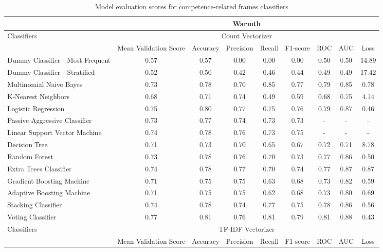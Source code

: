 \documentclass[Royal,sageapa,times]{sagej}
\begin{document}
\begin{landscape}
    \begin{longtable}[l]{lcccccccc}
    \caption{Model evaluation scores for competence-related frames classifiers}
    \label{table11}
    \hline
    & \multicolumn{8}{c}{Warmth} \\ \hline
    \endhead
    \multirow{2}{*}{Classifiers} & \multicolumn{8}{c}{Count Vectorizer} \\ \cline{2-9}
    & Mean   Validation Score & Accuracy & Precision & Recall & F1-score & ROC & AUC & Loss \\ \hline
    Dummy Classifier - Most   Frequent & 0.57 & 0.57 & 0.00 & 0.00 & 0.00 & 0.50 & 0.50 & 14.89 \\
    Dummy Classifier - Stratified & 0.52 & 0.50 & 0.42 & 0.46 & 0.44 & 0.49 & 0.49 & 17.42 \\
    Multinomial Naive Bayes & 0.73 & 0.78 & 0.70 & 0.85 & 0.77 & 0.79 & 0.85 & 0.78 \\
    K-Nearest Neighbors & 0.68 & 0.71 & 0.74 & 0.49 & 0.59 & 0.68 & 0.75 & 4.14 \\
    Logistic Regression & 0.75 & 0.80 & 0.77 & 0.75 & 0.76 & 0.79 & 0.87 & 0.46 \\
    Passive Aggressive Classifier & 0.73 & 0.77 & 0.74 & 0.73 & 0.73 & - & - & - \\
    Linear Support Vector Machine & 0.74 & 0.78 & 0.76 & 0.73 & 0.75 & - & - & - \\
    Decision Tree & 0.71 & 0.73 & 0.70 & 0.65 & 0.67 & 0.72 & 0.71 & 8.78 \\
    Random Forest & 0.73 & 0.78 & 0.76 & 0.70 & 0.73 & 0.77 & 0.86 & 0.50 \\
    Extra Trees Classifier & 0.74 & 0.78 & 0.77 & 0.70 & 0.74 & 0.77 & 0.87 & 0.87 \\
    Gradient Boosting Machine & 0.71 & 0.75 & 0.75 & 0.63 & 0.68 & 0.73 & 0.82 & 0.59 \\
    Adaptive Boosting Machine & 0.71 & 0.75 & 0.75 & 0.62 & 0.68 & 0.73 & 0.80 & 0.69 \\
    Stacking Classifier & 0.74 & 0.78 & 0.74 & 0.77 & 0.75 & 0.78 & 0.86 & 0.56 \\
    Voting Classifier & 0.77 & 0.81 & 0.76 & 0.81 & 0.79 & 0.81 & 0.88 & 0.43 \\ \hline
    \multirow{2}{*}{Classifiers} & \multicolumn{8}{c}{TF-IDF Vectorizer} \\ \cline{2-9}
    & Mean   Validation Score & Accuracy & Precision & Recall & F1-score & ROC & AUC & Loss \\ \hline

\end{longtable}
\end{landscape}
\end{document}
